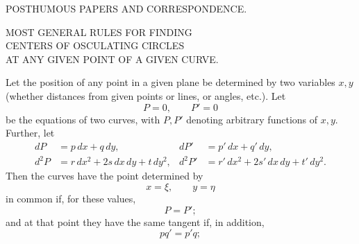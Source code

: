 %
\begin{center}
{\large POSTHUMOUS PAPERS AND CORRESPONDENCE.\par}
\bigskip
MOST GENERAL RULES FOR FINDING\\
CENTERS OF OSCULATING CIRCLES\\
AT ANY GIVEN POINT OF A GIVEN CURVE.
\end{center}

Let the position of any point in a given plane be determined by two variables $x,y$ (whether distances from given points or lines, or angles, etc.). Let
\[
P=0,\qquad P'=0
\]
be the equations of two curves, with $P,P'$ denoting arbitrary functions of $x,y$. Further, let
\[
\begin{aligned}
dP&=p\,dx+q\,dy,&dP'&=p'\,dx+q'\,dy,\\
d^2P&=r\,dx^2+2s\,dx\,dy+t\,dy^2,&d^2P'&=r'\,dx^2+2s'\,dx\,dy+t'\,dy^2.
\end{aligned}
\]
Then the curves have the point determined by
\[
x=\xi,\qquad y=\eta
\]
in common if, for these values,
\[
P=P';
\]
and at that point they have the same tangent if, in addition,
\[
pq'=p'q;
\]
